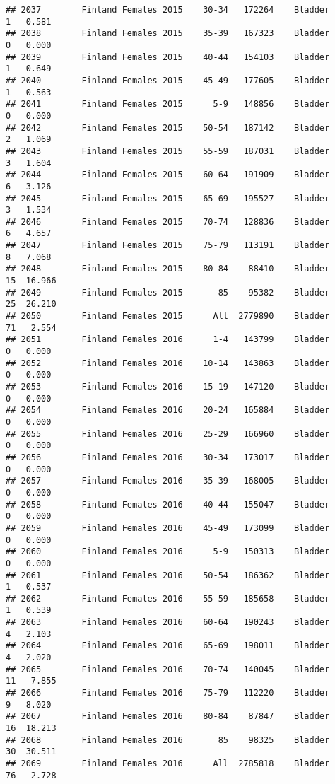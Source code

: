 \documentclass[
]{article}
\begin{document}
\begin{verbatim}
## 2037        Finland Females 2015    30-34   172264    Bladder      1   0.581
## 2038        Finland Females 2015    35-39   167323    Bladder      0   0.000
## 2039        Finland Females 2015    40-44   154103    Bladder      1   0.649
## 2040        Finland Females 2015    45-49   177605    Bladder      1   0.563
## 2041        Finland Females 2015      5-9   148856    Bladder      0   0.000
## 2042        Finland Females 2015    50-54   187142    Bladder      2   1.069
## 2043        Finland Females 2015    55-59   187031    Bladder      3   1.604
## 2044        Finland Females 2015    60-64   191909    Bladder      6   3.126
## 2045        Finland Females 2015    65-69   195527    Bladder      3   1.534
## 2046        Finland Females 2015    70-74   128836    Bladder      6   4.657
## 2047        Finland Females 2015    75-79   113191    Bladder      8   7.068
## 2048        Finland Females 2015    80-84    88410    Bladder     15  16.966
## 2049        Finland Females 2015       85    95382    Bladder     25  26.210
## 2050        Finland Females 2015      All  2779890    Bladder     71   2.554
## 2051        Finland Females 2016      1-4   143799    Bladder      0   0.000
## 2052        Finland Females 2016    10-14   143863    Bladder      0   0.000
## 2053        Finland Females 2016    15-19   147120    Bladder      0   0.000
## 2054        Finland Females 2016    20-24   165884    Bladder      0   0.000
## 2055        Finland Females 2016    25-29   166960    Bladder      0   0.000
## 2056        Finland Females 2016    30-34   173017    Bladder      0   0.000
## 2057        Finland Females 2016    35-39   168005    Bladder      0   0.000
## 2058        Finland Females 2016    40-44   155047    Bladder      0   0.000
## 2059        Finland Females 2016    45-49   173099    Bladder      0   0.000
## 2060        Finland Females 2016      5-9   150313    Bladder      0   0.000
## 2061        Finland Females 2016    50-54   186362    Bladder      1   0.537
## 2062        Finland Females 2016    55-59   185658    Bladder      1   0.539
## 2063        Finland Females 2016    60-64   190243    Bladder      4   2.103
## 2064        Finland Females 2016    65-69   198011    Bladder      4   2.020
## 2065        Finland Females 2016    70-74   140045    Bladder     11   7.855
## 2066        Finland Females 2016    75-79   112220    Bladder      9   8.020
## 2067        Finland Females 2016    80-84    87847    Bladder     16  18.213
## 2068        Finland Females 2016       85    98325    Bladder     30  30.511
## 2069        Finland Females 2016      All  2785818    Bladder     76   2.728

\end{verbatim}
\end{document}
